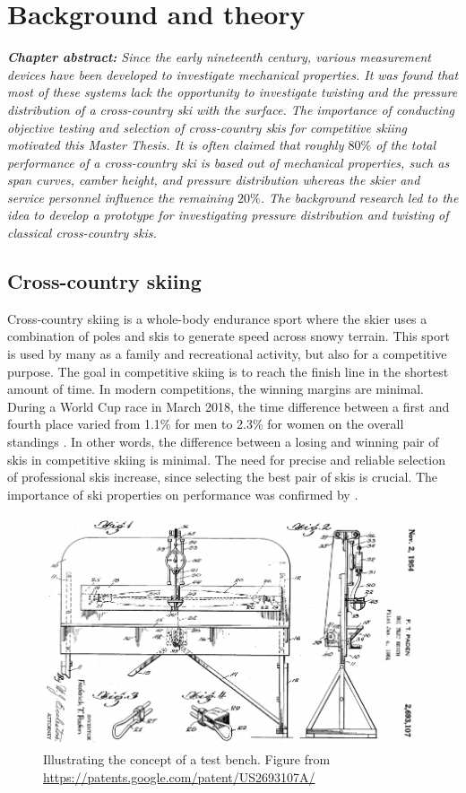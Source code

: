 \chapter{Background and theory}
\label{chap:background}
\textit{\textbf{Chapter abstract:} Since the early nineteenth century, various measurement devices have been developed to investigate mechanical properties. It was found that most of these systems lack the opportunity to investigate twisting and the pressure distribution of a cross-country ski with the surface. The importance of conducting objective testing and selection of cross-country skis for competitive skiing motivated this Master Thesis. It is often claimed that roughly $80\%$ of the total performance of a cross-country ski is based out of mechanical properties, such as span curves, camber height, and pressure distribution whereas the skier and service personnel influence the remaining $20\%$. The background research led to the idea to develop a prototype for investigating pressure distribution and twisting of classical cross-country skis.}
\section{Cross-country skiing}
Cross-country skiing is a whole-body endurance sport where the skier uses a combination of poles and skis to generate speed across snowy terrain. This sport is used by many as a family and recreational activity, but also for a competitive purpose. The goal in competitive skiing is to reach the finish line in the shortest amount of time. In modern competitions, the winning margins are minimal. During a World Cup race in March 2018, the time difference between a first and fourth place varied from 1.1\% for men to 2.3\% for women on the overall standings \citep{fis_2018}. In other words, the difference between a losing and winning pair of skis in competitive skiing is minimal. The need for precise and reliable selection of professional skis increase, since selecting the best pair of skis is crucial. The importance of ski properties on performance was confirmed by \cite{ronbeck_vikander_2007}.

\begin{figure}
    \centering
    \includegraphics[width=1\textwidth]{figures/earlytb.png}
    \caption{Illustrating the concept of a test bench. Figure from \url{https://patents.google.com/patent/US2693107A/}}
    \label{fig:earlytb}
\end{figure}

